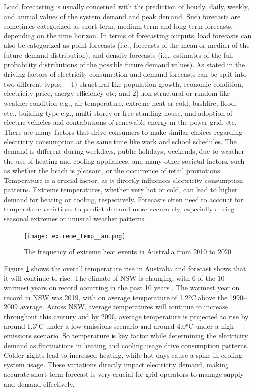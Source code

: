 \documentclass[mstat,12pt]{unswthesis}
\begin{document}
Load forecasting is usually concerned with the prediction of hourly,
daily, weekly, and annual values of the system demand and peak demand.
Such forecasts are sometimes categorized as short-term, medium-term and
long-term forecasts, depending on the time horizon. In terms of
forecasting outputs, load forecasts can also be categorized as point
forecasts (i.e., forecasts of the mean or median of the future demand
distribution), and density forecasts (i.e., estimates of the full
probability distributions of the possible future demand values). As
stated in \cite{nsw_epa_2021_energy_consumption} the driving factors of
electricity consumption and demand forecasts can be split into two
different types: ---1) structural like population growth, economic
condition, electricity price, energy efficiency etc; and 2)
non-structural or random like weather condition e.g., air temperature,
extreme heat or cold, bushfire, flood, etc., building type e.g.,
multi-storey or free-standing house, and adoption of electric vehicles
and contributions of renewable energy in the power grid, etc. There are
many factors that drive consumers to make similar choices regarding
electricity consumption at the same time like work and school schedules.
The demand is different during weekdays, public holidays, weekends, due
to weather the use of heating and cooling appliances, and many other
societal factors, such as whether the beach is pleasant, or the
occurrence of retail promotions. Temperature is a crucial factor, as it
directly influences electricity consumption patterns. Extreme
temperatures, whether very hot or cold, can lead to higher demand for
heating or cooling, respectively. Forecasts often need to account for
temperature variations to predict demand more accurately, especially
during seasonal extremes or unusual weather patterns.

\begin{figure}[H]
\centering
\texttt{[image: extreme\_temp\_\_au.png]}
\caption{The frequency of extreme heat events in Australia from 2010 to 2020}\label{extreme}
\end{figure}

Figure \ref{extreme} shows the overall temperature rise in Australia and
forecast shows that it will continue to rise. The climate of NSW is
changing, with 6 of the 10 warmest years on record occurring in the past
10 years \cite{nswAdaptNSW}. The warmest year on record in NSW was 2019,
with on average temperature of 1.2°C above the 1990--2009 average.
Across NSW, average temperatures will continue to increase throughout
this century and by 2090, average temperature is projected to rise by
around 1.3°C under a low emissions scenario and around 4.0°C under a
high emissions scenario. So temperature is key factor while determining
the electricity demand as fluctuations in heating and cooling usage
drive consumption patterns. Colder nights lead to increased heating,
while hot days cause a spike in cooling system usage. These variations
directly impact electricity demand, making accurate short-term forecast
is very crucial for grid operators to manage supply and demand
effectively.
\end{document}
